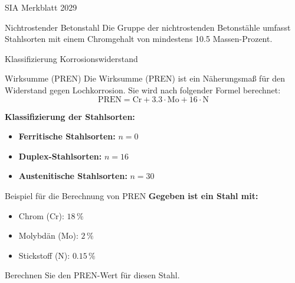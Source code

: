 \begin{frame}{SIA Merkblatt 2029}
    \begin{Definition_BS}{Nichtrostender Betonstahl}
        Die Gruppe der nichtrostenden Betonstähle umfasst Stahlsorten mit einem Chromgehalt von mindestens 10.5 Massen-Prozent.
    \end{Definition_BS}
\end{frame}

\begin{frame}{Klassifizierung Korrosionswiderstand}
    \begin{Definition_BS}{Wirksumme (PREN)}
        Die Wirksumme (PREN) ist ein Näherungsmaß für den Widerstand gegen Lochkorrosion. Sie wird nach folgender Formel berechnet:
        \begin{equation*}
            \text{PREN} = \text{Cr} + 3.3 \cdot \text{Mo} + 16 \cdot \text{N}
        \end{equation*}
    \end{Definition_BS}
    

    \textbf{Klassifizierung der Stahlsorten:}
    \begin{itemize}
        \item [\textbullet] \textbf{Ferritische Stahlsorten:} \( n = 0 \)
        \item [\textbullet] \textbf{Duplex-Stahlsorten:} \( n = 16 \)
        \item [\textbullet] \textbf{Austenitische Stahlsorten:} \( n = 30 \)
    \end{itemize}
\end{frame}



\begin{frame}{Beispiel für die Berechnung von PREN}
    \textbf{Gegeben ist ein Stahl mit:}
    \begin{itemize}
        \item Chrom (Cr): \( 18\,\% \)
        \item Molybdän (Mo): \( 2\,\% \)
        \item Stickstoff (N): \( 0.15\,\% \)
    \end{itemize}
    \hspace{20pt}
    \begin{Fragenblock}
        Berechnen Sie den PREN-Wert für diesen Stahl.
    \end{Fragenblock}
\end{frame}
    
